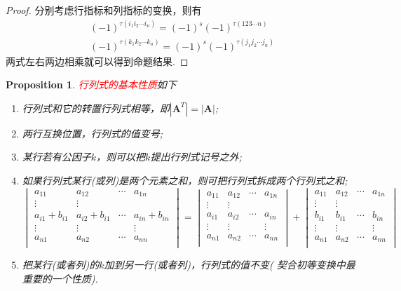 \documentclass{article}
\newtheorem{proposition}[theorem]{Proposition}
\newcommand{\redt}[1]{\textcolor{red}{#1}}
\begin{document}
\begin{proof}
分别考虑行指标和列指标的变换，则有
$$
\begin{array}{ll}
(-1)^{\tau(i_1i_2\cdots i_n)} = (-1)^s (-1)^{\tau(123\cdots n)} \\
(-1)^{\tau(k_1k_2\cdots k_n)} = (-1)^s (-1)^{\tau(j_1j_2\cdots j_n)}
\end{array}
$$
两式左右两边相乘就可以得到命题结果.
\end{proof}

\begin{proposition}
\rm \redt{行列式的基本性质}如下
\begin{enumerate}
	\item 行列式和它的转置行列式相等，即$|\mathbf{A}^T| = |\mathbf{A}|$;
	\item 两行互换位置，行列式的值变号;
	\item 某行若有公因子$k$，则可以把$k$提出行列式记号之外;
	\item 如果行列式某行(或列)是两个元素之和，则可把行列式拆成两个行列式之和;
	$$
	\begin{vmatrix}
a_{11} & a_{12} & \cdots & a_{1n} \\
\vdots & \vdots & 		& \\
a_{i1}+b_{i1} & a_{i2}+b_{i1} & \cdots & a_{in}+b_{in} \\
\vdots & \vdots & 		 & \vdots \\
a_{n1} & a_{n2} & \cdots & a_{nn} \\
\end{vmatrix}
	 = \begin{vmatrix}
a_{11} & a_{12} & \cdots & a_{1n} \\
\vdots & \vdots & 		& \\
a_{i1} & a_{i2} & \cdots & a_{in} \\
\vdots & \vdots & 		 & \vdots \\
a_{n1} & a_{n2} & \cdots & a_{nn} \\
\end{vmatrix} +
	 \begin{vmatrix}
a_{11} & a_{12} & \cdots & a_{1n} \\
\vdots & \vdots & 		& \\
b_{i1} & b_{i1} & \cdots & b_{in} \\
\vdots & \vdots & 		 & \vdots \\
a_{n1} & a_{n2} & \cdots & a_{nn} \\
\end{vmatrix}
	$$
	\item 把某行(或者列)的$k$加到另一行(或者列)，行列式的值不变({\color{red} 契合初等变换中最重要的一个性质}).
\end{enumerate}
\end{proposition}
\end{document}
